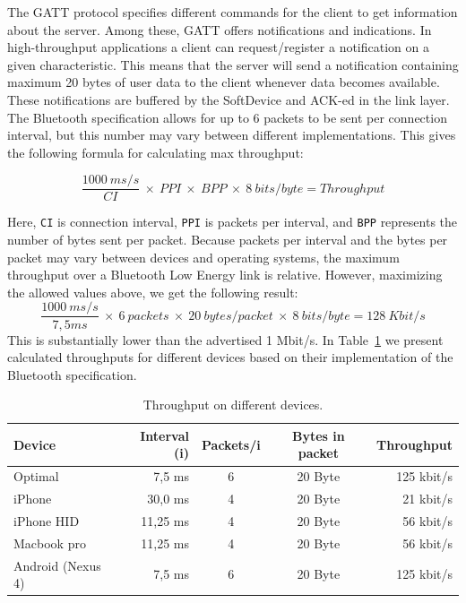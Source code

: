 The GATT protocol specifies different commands for the client to get information about the server. Among these, GATT offers notifications and indications. In high-throughput applications a client can request/register a notification on a given characteristic. This means that the server will send a notification containing maximum 20 bytes of user data to the client whenever data becomes available. These notifications are buffered by the SoftDevice and ACK-ed in the link layer. The Bluetooth specification allows for up to 6 packets to be sent per connection interval, but this number may vary between different implementations. This gives the following formula for calculating max throughput:

\[
\frac{1000\: ms/s}{CI}\: \times\: PPI\: \times\: BPP\: \times\: 8\: bits/byte = Throughput
\]

\newline
\noindent
Here, \texttt{CI} is connection interval, \texttt{PPI} is packets per interval, and \texttt{BPP} represents the number of bytes sent per packet. Because packets per interval and the bytes per packet may vary between devices and operating systems, the maximum throughput over a Bluetooth Low Energy link is relative. However, maximizing the allowed values above, we get the following result: 
\[
\frac{1000\: ms/s}{7,5ms}\: \times\: 6\: packets\: \times\: 20\:bytes/packet\: \times\: 8\: bits/byte = 128\:Kbit/s
\]
\newline
\noindent
This is substantially lower than the advertised 1 Mbit/s. In Table~\ref{tab:ble_device_throughput} we present calculated throughputs for different devices based on their implementation of the Bluetooth specification.

\begin{table}[]
\centering
\caption{Throughput on different devices.}
\label{tab:ble_device_throughput}
\begin{tabular}{@{}lrccr@{}}
\toprule
\textbf{Device}   & \textbf{Interval (i)} & \textbf{Packets/i} & \textbf{Bytes in packet} & \textbf{Throughput} \\ \midrule
Optimal	          & 7,5 ms	  & 6	  & 20 Byte	  & 125 kbit/s \\
iPhone	          & 30,0 ms	  & 4	  & 20 Byte	  & 21 kbit/s   \\
iPhone HID	      & 11,25 ms	& 4	  & 20 Byte	  & 56 kbit/s \\
Macbook pro	      & 11,25 ms	& 4	  & 20 Byte	  & 56 kbit/s \\
Android (Nexus 4)	& 7,5 ms	  & 6	  & 20 Byte	  & 125 kbit/s  \\ \bottomrule
\end{tabular}
\end{table}


